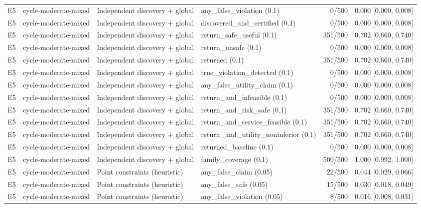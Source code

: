 \begin{longtable}{p{.04\linewidth}p{.18\linewidth}p{.19\linewidth}p{.16\linewidth}r p{.21\linewidth}}
E5 & cycle-moderate-mixed & Independent discovery + global & any\_false\_violation (0.1) & 0/500 & 0.000 [0.000, 0.008]\\
E5 & cycle-moderate-mixed & Independent discovery + global & discovered\_and\_certified (0.1) & 0/500 & 0.000 [0.000, 0.008]\\
E5 & cycle-moderate-mixed & Independent discovery + global & return\_safe\_useful (0.1) & 351/500 & 0.702 [0.660, 0.740]\\
E5 & cycle-moderate-mixed & Independent discovery + global & return\_unsafe (0.1) & 0/500 & 0.000 [0.000, 0.008]\\
E5 & cycle-moderate-mixed & Independent discovery + global & returned (0.1) & 351/500 & 0.702 [0.660, 0.740]\\
E5 & cycle-moderate-mixed & Independent discovery + global & true\_violation\_detected (0.1) & 0/500 & 0.000 [0.000, 0.008]\\
E5 & cycle-moderate-mixed & Independent discovery + global & any\_false\_utility\_claim (0.1) & 0/500 & 0.000 [0.000, 0.008]\\
E5 & cycle-moderate-mixed & Independent discovery + global & return\_and\_infeasible (0.1) & 0/500 & 0.000 [0.000, 0.008]\\
E5 & cycle-moderate-mixed & Independent discovery + global & return\_and\_risk\_safe (0.1) & 351/500 & 0.702 [0.660, 0.740]\\
E5 & cycle-moderate-mixed & Independent discovery + global & return\_and\_service\_feasible (0.1) & 351/500 & 0.702 [0.660, 0.740]\\
E5 & cycle-moderate-mixed & Independent discovery + global & return\_and\_utility\_noninferior (0.1) & 351/500 & 0.702 [0.660, 0.740]\\
E5 & cycle-moderate-mixed & Independent discovery + global & returned\_baseline (0.1) & 0/500 & 0.000 [0.000, 0.008]\\
E5 & cycle-moderate-mixed & Independent discovery + global & family\_coverage (0.1) & 500/500 & 1.000 [0.992, 1.000]\\
E5 & cycle-moderate-mixed & Point constraints (heuristic) & any\_false\_claim (0.05) & 22/500 & 0.044 [0.029, 0.066]\\
E5 & cycle-moderate-mixed & Point constraints (heuristic) & any\_false\_safe (0.05) & 15/500 & 0.030 [0.018, 0.049]\\
E5 & cycle-moderate-mixed & Point constraints (heuristic) & any\_false\_violation (0.05) & 8/500 & 0.016 [0.008, 0.031]\\

\end{longtable}
